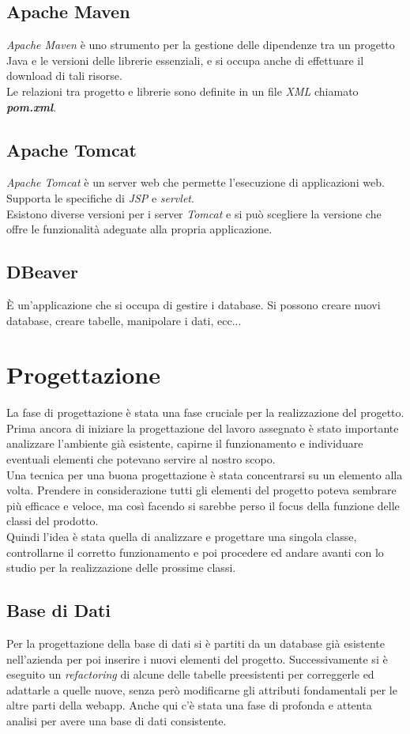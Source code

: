 \subsection*{Apache Maven}
\textit{Apache Maven} è uno strumento per la gestione delle dipendenze tra un progetto Java e le versioni delle librerie essenziali, e si occupa anche di effettuare il download di tali risorse. \\
Le relazioni tra progetto e librerie sono definite in un file \textit{XML} chiamato \textit{\textbf{pom.xml}}.

\subsection*{Apache Tomcat}
\textit{Apache Tomcat} è un server web che permette l'esecuzione di applicazioni web. Supporta le specifiche di \textit{JSP} e \textit{servlet}.\\
Esistono diverse versioni per i server \textit{Tomcat} e si può scegliere la versione che offre le funzionalità adeguate alla propria applicazione.
\subsection*{DBeaver}
È un'applicazione che si occupa di gestire i database. Si possono creare nuovi database, creare tabelle, manipolare i dati, ecc...

\section{Progettazione}
\label{sec:progettazione}
La fase di progettazione è stata una fase cruciale per la realizzazione del progetto. Prima ancora di iniziare la progettazione del lavoro assegnato è stato importante analizzare l'ambiente già esistente, capirne il funzionamento e individuare eventuali elementi che potevano servire al nostro scopo. \\
Una tecnica per una buona progettazione è stata concentrarsi su un elemento alla volta. Prendere in considerazione tutti gli elementi del progetto poteva sembrare più efficace e veloce, ma così facendo si sarebbe perso il focus della funzione delle classi del prodotto.\\ 
Quindi l'idea è stata quella di analizzare e progettare una singola classe, controllarne il corretto funzionamento e poi procedere ed andare avanti con lo studio per la realizzazione delle prossime classi.


\subsection{Base di Dati}
Per la progettazione della base di dati si è partiti da un database già esistente nell'azienda per poi inserire i nuovi elementi del progetto. Successivamente si è eseguito un \textit{refactoring} di alcune delle tabelle preesistenti per correggerle ed adattarle a quelle nuove, senza però modificarne gli attributi fondamentali per le altre parti della webapp. Anche qui c'è stata una fase di profonda e attenta analisi per avere una base di dati consistente. 
